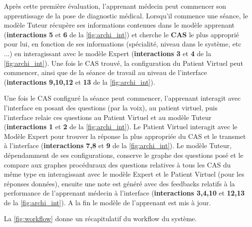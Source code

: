 Après cette première évaluation, l'apprenant médecin peut commencer son apprentissage de la pose de diagnostic médical. Lorsqu'il commence une séance, le modèle Tuteur récupère ses informations contenues dans le modèle apprenant (\textbf{interactions 5} et \textbf{6} de la \autoref{fig:archi_int}) et cherche le \textbf{CAS} le plus approprié pour lui, en fonction de ses informations (spécialité, niveau dans le système, etc ...) en interagissant avec le modèle Expert (\textbf{interactions 3} et \textbf{4} de la \autoref{fig:archi_int}). Une fois le CAS trouvé, la configuration du Patient Virtuel peut commencer, ainsi que de la séance de travail au niveau de l'interface (\textbf{interactions 9,10,12} et \textbf{13} de la \autoref{fig:archi_int}).

Une fois le CAS configuré la séance peut commencer, l'apprenant interagit avec l'interface en posant des questions (par la voix), au patient virtuel, puis l'interface relaie ces questions au Patient Virtuel et au modèle Tuteur (\textbf{interactions 1} et \textbf{2} de la \autoref{fig:archi_int}). Le Patient Virtuel interagit avec le Modèle Expert pour trouver la réponse la plus appropriée du CAS et le transmet à l'interface (\textbf{interactions 7,8} et \textbf{9} de la \autoref{fig:archi_int}). Le modèle Tuteur, dépendamment de ses configurations, conserve le graphe des questions posé et le compare aux graphes procéduraux des questions relatives à tous les CAS du même type en interagissant avec le modèle Expert et le Patient Virtuel (pour les réponses données), ensuite une note est généré avec des feedbacks relatifs à la performance de l'apprenant médecin à l'interface  (\textbf{interactions 3,4,10} et \textbf{12,13} de la \autoref{fig:archi_int}). A la fin le modèle de l'apprenant est mis à jour.

La \autoref{fig:workflow} donne un récapitulatif du workflow du système.



